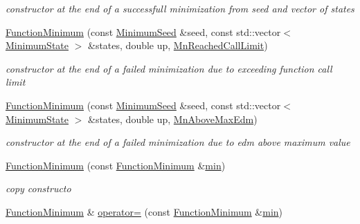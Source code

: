 \begin{DoxyCompactItemize}
\begin{DoxyCompactList}\small\item\em constructor at the end of a successfull minimization from seed and vector of states \end{DoxyCompactList}\item 
\mbox{\hyperlink{classROOT_1_1Minuit2_1_1FunctionMinimum_aa68c6d1a70d47537fef4990cd797ebc0}{Function\+Minimum}} (const \mbox{\hyperlink{classROOT_1_1Minuit2_1_1MinimumSeed}{Minimum\+Seed}} \&seed, const std\+::vector$<$ \mbox{\hyperlink{classROOT_1_1Minuit2_1_1MinimumState}{Minimum\+State}} $>$ \&states, double up, \mbox{\hyperlink{classROOT_1_1Minuit2_1_1FunctionMinimum_1_1MnReachedCallLimit}{Mn\+Reached\+Call\+Limit}})
\begin{DoxyCompactList}\small\item\em constructor at the end of a failed minimization due to exceeding function call limit \end{DoxyCompactList}\item 
\mbox{\hyperlink{classROOT_1_1Minuit2_1_1FunctionMinimum_a70961c8a405bd4298247c9b353804154}{Function\+Minimum}} (const \mbox{\hyperlink{classROOT_1_1Minuit2_1_1MinimumSeed}{Minimum\+Seed}} \&seed, const std\+::vector$<$ \mbox{\hyperlink{classROOT_1_1Minuit2_1_1MinimumState}{Minimum\+State}} $>$ \&states, double up, \mbox{\hyperlink{classROOT_1_1Minuit2_1_1FunctionMinimum_1_1MnAboveMaxEdm}{Mn\+Above\+Max\+Edm}})
\begin{DoxyCompactList}\small\item\em constructor at the end of a failed minimization due to edm above maximum value \end{DoxyCompactList}\item 
\mbox{\hyperlink{classROOT_1_1Minuit2_1_1FunctionMinimum_a79c734eb76f50e7638255095bd0670aa}{Function\+Minimum}} (const \mbox{\hyperlink{classROOT_1_1Minuit2_1_1FunctionMinimum}{Function\+Minimum}} \&\mbox{\hyperlink{adat__devel_2lib_2SU3_2SU3__internal_8h_ab0f5fed3171eb00d1c5f037d9f518a23}{min}})
\begin{DoxyCompactList}\small\item\em copy constructo \end{DoxyCompactList}\item 
\mbox{\hyperlink{classROOT_1_1Minuit2_1_1FunctionMinimum}{Function\+Minimum}} \& \mbox{\hyperlink{classROOT_1_1Minuit2_1_1FunctionMinimum_a107909f1a994436795eb310f951f14cb}{operator=}} (const \mbox{\hyperlink{classROOT_1_1Minuit2_1_1FunctionMinimum}{Function\+Minimum}} \&\mbox{\hyperlink{adat__devel_2lib_2SU3_2SU3__internal_8h_ab0f5fed3171eb00d1c5f037d9f518a23}{min}})

\end{DoxyCompactItemize}
